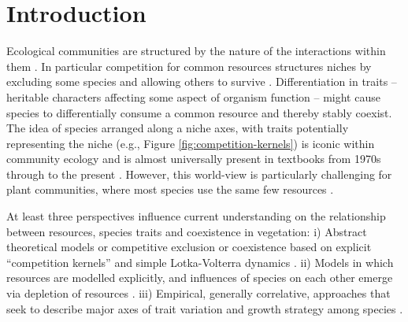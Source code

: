 \documentclass[a4paper,11pt]{article}
\begin{document}
\section{Introduction}

Ecological communities are structured by the nature of the
interactions within them \citep{Schluter-2000}.
In particular competition for common resources structures niches by
excluding some species and allowing others to survive
\citep[e.g.][]{Gause-1934,Lack-1947,MacArthur-1967}.
%
Differentiation in traits -- heritable characters affecting some aspect
of organism function -- might cause species to differentially consume
a common resource and thereby stably coexist.
The idea of species arranged along a niche axes, with traits potentially
representing the niche (e.g., Figure
\ref{fig:competition-kernels}) is iconic within community ecology and
is almost universally present in textbooks from 1970s through to the
present \citep[e.g.,][]{Krebs-1972, Ricklefs-1973, Ricklefs-1999,
  Krebs-2013}.
%
However, this world-view is particularly challenging for plant
communities, where most species use the same few resources
\citep[e.g.,][]{Whittaker-1970, Grime-1979, Hubbell-2001,
  Westoby-2002}.

At least three perspectives influence current understanding on
the relationship between resources, species traits and coexistence
in vegetation:
i) Abstract theoretical models or competitive exclusion or coexistence based on explicit ``competition kernels'' and simple Lotka-Volterra dynamics
\citep[e.g.][]{MacArthur-1967,Case-1982,Dieckmann-1999,Leimar-2013}.
%
ii) Models in which resources are modelled explicitly, and influences of species
on each other emerge via depletion of resources
\citep[e.g.][]{Tilman-1977, Huston-1987, Kohyama-1993, Falster-2011}.
%
iii) Empirical, generally correlative, approaches that seek to
describe major axes of trait variation and growth strategy among species
\citep[e.g.][]{Grime-1979, Weiher-1999, Westoby-2002}.

\end{document}
